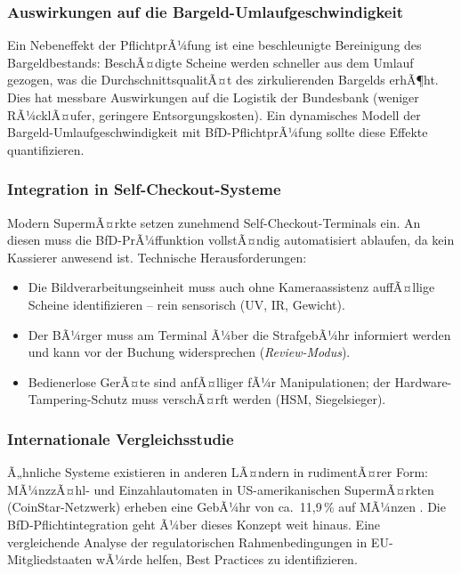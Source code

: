 ﻿\documentclass[a4paper,12pt]{article}
\theoremstyle{definition}
\begin{document}
\subsubsection{Auswirkungen auf die Bargeld-Umlaufgeschwindigkeit}

Ein Nebeneffekt der PflichtprÃ¼fung ist eine beschleunigte Bereinigung
des Bargeldbestands: BeschÃ¤digte Scheine werden schneller aus dem Umlauf
gezogen, was die DurchschnittsqualitÃ¤t des zirkulierenden Bargelds erhÃ¶ht.
Dies hat messbare Auswirkungen auf die Logistik der Bundesbank
(weniger RÃ¼cklÃ¤ufer, geringere Entsorgungskosten).
Ein dynamisches Modell der Bargeld-Umlaufgeschwindigkeit \cite{ross2014introduction}
mit BfD-PflichtprÃ¼fung sollte diese Effekte quantifizieren.

\subsubsection{Integration in Self-Checkout-Systeme}

Modern SupermÃ¤rkte setzen zunehmend Self-Checkout-Terminals ein.
An diesen muss die BfD-PrÃ¼ffunktion vollstÃ¤ndig automatisiert ablaufen,
da kein Kassierer anwesend ist.  Technische Herausforderungen:
\begin{itemize}
  \item Die Bildverarbeitungseinheit muss auch ohne Kameraassistenz
        auffÃ¤llige Scheine identifizieren -- rein sensorisch (UV, IR, Gewicht).
  \item Der BÃ¼rger muss am Terminal Ã¼ber die StrafgebÃ¼hr informiert werden
        und kann vor der Buchung widersprechen (\emph{Review-Modus}).
  \item Bedienerlose GerÃ¤te sind anfÃ¤lliger fÃ¼r Manipulationen;
        der Hardware-Tampering-Schutz muss verschÃ¤rft werden (HSM, Siegelsieger).
\end{itemize}

\subsubsection{Internationale Vergleichsstudie}

Ã„hnliche Systeme existieren in anderen LÃ¤ndern in rudimentÃ¤rer Form:
MÃ¼nzzÃ¤hl- und Einzahlautomaten in US-amerikanischen SupermÃ¤rkten
(CoinStar-Netzwerk) erheben eine GebÃ¼hr von ca.\ 11,9\,\% auf MÃ¼nzen \cite{coinstar2024}.
Die BfD-Pflichtintegration geht Ã¼ber dieses Konzept weit hinaus.
Eine vergleichende Analyse der regulatorischen Rahmenbedingungen in
EU-Mitgliedstaaten wÃ¼rde helfen, Best Practices zu identifizieren.
\end{document}
